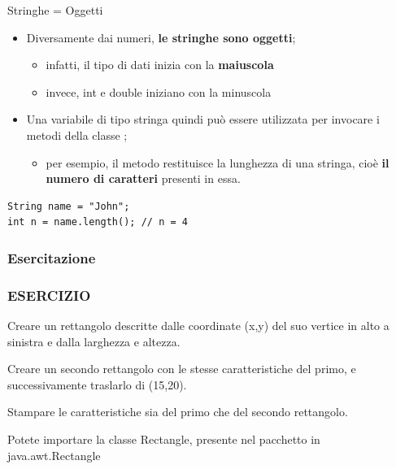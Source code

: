 \begin{frame}[fragile]
\begin{block}{Stringhe = Oggetti}
\begin{itemize}
\item Diversamente dai numeri, \textbf{le stringhe sono oggetti};
\begin{itemize}
\item infatti, il tipo di dati  inizia con la \textbf{maiuscola}
\item invece, \alert{int} e \alert{double} iniziano con la minuscola
\end{itemize}
\item Una variabile di tipo stringa quindi può essere utilizzata per invocare i metodi della classe ;
\begin{itemize}
\item per esempio, il metodo  restituisce la lunghezza di una stringa, cioè \textbf{il numero di caratteri}
presenti in essa.
\end{itemize}
\end{itemize}
\end{block}
\begin{block}{}
\begin{lstlisting}
String name = "John";
int n = name.length(); // n = 4
\end{lstlisting}
\end{block}
\end{frame}

\subsubsection*{Esercitazione}
\begin{frame}
\frametitle{ESERCIZIO}
\begin{block}{}
Creare un rettangolo descritte dalle coordinate (x,y) del suo vertice in alto a sinistra e dalla larghezza e altezza.
\end{block}
\begin{block}{}
Creare un secondo rettangolo con le stesse caratteristiche del primo, e successivamente traslarlo di (15,20).
\end{block}
\begin{block}{}
Stampare le caratteristiche sia del primo che del secondo rettangolo.
\end{block}
\begin{block}{}
Potete importare la classe Rectangle, presente nel pacchetto in \alert{java.awt.Rectangle}
\end{block}
\end{frame}

